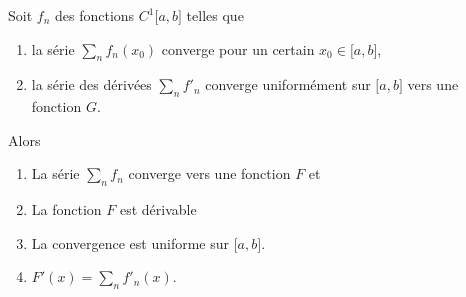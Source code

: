 \begin{theorem} \label{ThoCSGaPY}
	Soit \( f_n\) des fonctions \( C^1\mathopen[ a , b \mathclose]\) telles que
	\begin{enumerate}
		\item
		      la série \( \sum_n f_n(x_0)\) converge pour un certain \( x_0\in\mathopen[ a , b \mathclose]\),
		\item
		      la série des dérivées \( \sum_n f'_n\) converge uniformément sur \( \mathopen[ a , b \mathclose]\) vers une fonction \( G\).
	\end{enumerate}
	Alors
	\begin{enumerate}
		\item		\label{ITEMooNBHUooMvbJoP}
		      La série \( \sum_n f_n\) converge vers une fonction \( F\) et
		\item
		      La fonction \( F\) est dérivable
		\item		\label{ITEMooTYLMooQdSdoK}
		      La convergence est uniforme sur \( \mathopen[ a , b \mathclose]\).
		\item
		      \( F'(x)=\sum_nf'_n(x)\).
	\end{enumerate}
\end{theorem}


